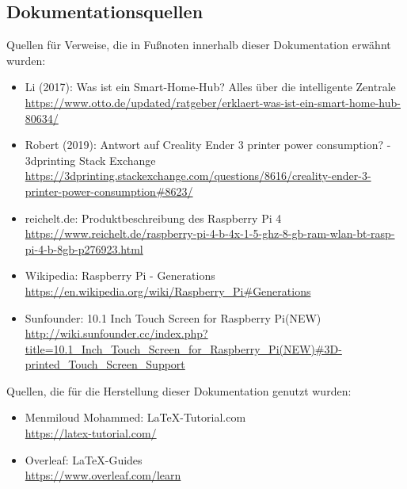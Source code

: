 \subsection{Dokumentationsquellen}\label{qu_doku}
Quellen für Verweise, die in Fußnoten innerhalb dieser Dokumentation erwähnt wurden:
\begin{itemize}
 		\item Li (2017): Was ist ein Smart-Home-Hub? Alles über die intelligente Zentrale\\ {\url{https://www.otto.de/updated/ratgeber/erklaert-was-ist-ein-smart-home-hub-80634/}}
 		\item Robert (2019): Antwort auf Creality Ender 3 printer power consumption? - 3dprinting Stack Exchange\\ {\url{https://3dprinting.stackexchange.com/questions/8616/creality-ender-3-printer-power-consumption#8623/}}
 		\item reichelt.de: Produktbeschreibung des Raspberry Pi 4\\{\url{https://www.reichelt.de/raspberry-pi-4-b-4x-1-5-ghz-8-gb-ram-wlan-bt-rasp-pi-4-b-8gb-p276923.html}}
 		\item Wikipedia: Raspberry Pi - Generations\\{\url{https://en.wikipedia.org/wiki/Raspberry_Pi#Generations}}
 		\item Sunfounder: 10.1 Inch Touch Screen for Raspberry Pi(NEW)\\{\url{http://wiki.sunfounder.cc/index.php?title=10.1_Inch_Touch_Screen_for_Raspberry_Pi(NEW)#3D-printed_Touch_Screen_Support}}
\end{itemize}
Quellen, die für die Herstellung dieser Dokumentation genutzt wurden:
\begin{itemize}
	\item Menmiloud Mohammed: \LaTeX -Tutorial.com\\{\url{https://latex-tutorial.com/}}
	\item Overleaf: \LaTeX -Guides\\{\url{https://www.overleaf.com/learn}}
\end{itemize}